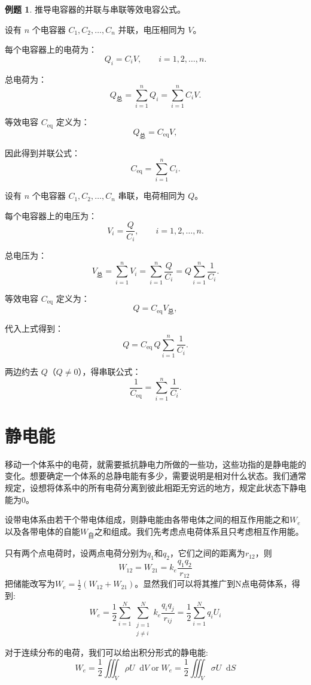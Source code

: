 \documentclass[12pt,a4paper,oneside]{report}
\theoremstyle{definition}
\newtheorem{example}{例题}[chapter]
\theoremstyle{remark}
\renewcommand{\d}{\mathop{}\!\mathrm{d}}
\begin{document}
\begin{example}
推导电容器的并联与串联等效电容公式。

设有 $n$ 个电容器 $C_1, C_2, \dots, C_n$ 并联，电压相同为 $V$。

每个电容器上的电荷为：
\[
Q_i = C_i V,\qquad i=1,2,\dots,n.
\]

总电荷为：
\[
Q_{\text{总}} = \sum_{i=1}^n Q_i = \sum_{i=1}^n C_i V.
\]

等效电容 $C_{\text{eq}}$ 定义为：
\[
Q_{\text{总}} = C_{\text{eq}} V,
\]

因此得到并联公式：
\[
C_{\text{eq}} = \sum_{i=1}^n C_i.
\]

设有 $n$ 个电容器 $C_1, C_2, \dots, C_n$ 串联，电荷相同为 $Q$。

每个电容器上的电压为：
\[
V_i = \frac{Q}{C_i},\qquad i=1,2,\dots,n.
\]

总电压为：
\[
V_{\text{总}} = \sum_{i=1}^n V_i = \sum_{i=1}^n \frac{Q}{C_i}
= Q \sum_{i=1}^n \frac{1}{C_i}.
\]

等效电容 $C_{\text{eq}}$ 定义为：
\[
Q = C_{\text{eq}} V_{\text{总}},
\]

代入上式得到：
\[
Q = C_{\text{eq}}\, Q \sum_{i=1}^n \frac{1}{C_i}.
\]

两边约去 $Q$（$Q\neq 0$），得串联公式：
\[
\frac{1}{C_{\text{eq}}} = \sum_{i=1}^n \frac{1}{C_i}.
\]
\end{example}

\section{静电能}
移动一个体系中的电荷，就需要抵抗静电力所做的一些功，这些功指的是静电能的变化。想要确定一个体系的总静电能有多少，需要说明是相对什么状态。我们通常规定，设想将体系中的所有电荷分离到彼此相距无穷远的地方，规定此状态下静电能为0。

设带电体系由若干个带电体组成，则静电能由各带电体之间的相互作用能之和$W_e$以及各带电体的自能$W_{\text{自}}$之和组成。我们先考虑点电荷体系且只考虑相互作用能。

只有两个点电荷时，设两点电荷分别为$q_1$和$q_2$，它们之间的距离为$r_{12}$，则
\[
W_{12}= W_{21} = k_e \frac{q_1 q_2}{r_{12}}
\]
把储能改写为$W_e=\frac{1}{2}(W_{12}+W_{21})$。显然我们可以将其推广到N点电荷体系，得到:
\[
W_e = \frac{1}{2} \sum_{i=1}^N \sum_{\substack{j=1 \\ j\neq i}}^N k_e \frac{q_i q_j}{r_{ij}} = \frac{1}{2} \sum_{i=1}^N q_i U_i
\]

对于连续分布的电荷，我们可以给出积分形式的静电能:
\[
W_e = \frac{1}{2} \iiint_V \rho U \d V \; \text{or} \; W_e = \frac{1}{2} \iiint_V \sigma U \d S    
\]
\end{document}
